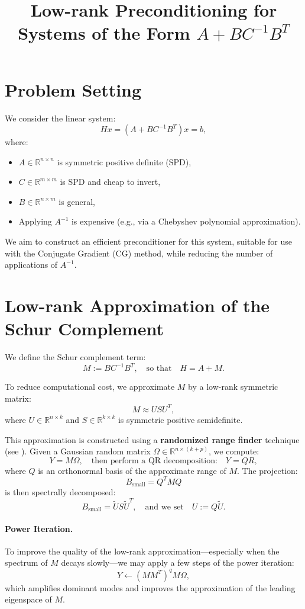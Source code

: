 \documentclass{article}
\title{Low-rank Preconditioning for Systems of the Form $A + B C^{-1} B^T$}
\author{}
\date{}
\begin{document}
\maketitle

\section*{Problem Setting}

We consider the linear system:
\[
H x = (A + B C^{-1} B^T) x = b,
\]
where:
\begin{itemize}
  \item $A \in \mathbb{R}^{n \times n}$ is symmetric positive definite (SPD),
  \item $C \in \mathbb{R}^{m \times m}$ is SPD and cheap to invert,
  \item $B \in \mathbb{R}^{n \times m}$ is general,
  \item Applying $A^{-1}$ is expensive (e.g., via a Chebyshev polynomial approximation).
\end{itemize}

We aim to construct an efficient preconditioner for this system, suitable for use with the Conjugate Gradient (CG) method, while reducing the number of applications of $A^{-1}$.

\section*{Low-rank Approximation of the Schur Complement}

We define the Schur complement term:
\[
M := B C^{-1} B^T,
\quad \text{so that} \quad
H = A + M.
\]

To reduce computational cost, we approximate $M$ by a low-rank symmetric matrix:
\[
M \approx U S U^T,
\]
where $U \in \mathbb{R}^{n \times k}$ and $S \in \mathbb{R}^{k \times k}$ is symmetric positive semidefinite.

This approximation is constructed using a \textbf{randomized range finder} technique (see \cite{halko2011finding}). Given a Gaussian random matrix $\Omega \in \mathbb{R}^{n \times (k+p)}$, we compute:
\[
Y = M \Omega,
\quad \text{then perform a QR decomposition:} \quad
Y = QR,
\]
where $Q$ is an orthonormal basis of the approximate range of $M$. The projection:
\[
B_{\text{small}} = Q^T M Q
\]
is then spectrally decomposed:
\[
B_{\text{small}} = \tilde{U} S \tilde{U}^T,
\quad \text{and we set} \quad
U := Q \tilde{U}.
\]

\paragraph{Power Iteration.}
To improve the quality of the low-rank approximation—especially when the spectrum of $M$ decays slowly—we may apply a few steps of the power iteration:
\[
Y \leftarrow (M M^T)^q M \Omega,
\]
which amplifies dominant modes and improves the approximation of the leading eigenspace of $M$.
\end{document}
